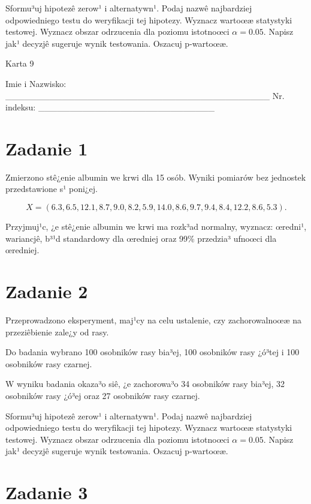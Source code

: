 \documentclass[a4paper,12pt]{article}
\begin{document}
     Sformu³uj hipotezê zerow¹ i alternatywn¹. 
     Podaj nazwê najbardziej odpowiedniego testu do weryfikacji tej hipotezy. 
     Wyznacz wartoœæ statystyki testowej. 
     Wyznacz obszar odrzucenia dla poziomu istotnoœci $\alpha=0.05$. 
     Napisz jak¹ decyzjê sugeruje wynik testowania. 
     Oszacuj p-wartoœæ. \vspace{1cm} 

  \clearpage  Karta  9  

 Imie i Nazwisko: \_\_\_\_\_\_\_\_\_\_\_\_\_\_\_\_\_\_\_\_\_\_\_\_\_\_\_\_\_\_\_\_\_\_\_\_\_\_\_\_\_\_ Nr. indeksu: \_\_\_\_\_\_\_\_\_\_\_\_\_\_\_\_\_\_\_\_\_\_\_\_\_\_\_\_ 
 \section*{Zadanie 1}
     
     Zmierzono stê¿enie albumin we krwi dla 15 osób. 
     Wyniki pomiarów bez jednostek przedstawione s¹ poni¿ej. 
     
     \noindent $$X=(  6.3,  6.5, 12.1,  8.7,  9.0,  8.2,  5.9, 14.0,  8.6,  9.7,  9.4,  8.4, 12.2,  8.6,  5.3 ).$$
     
     Przyjmuj¹c, ¿e stê¿enie albumin we krwi ma rozk³ad normalny, 
     wyznacz: œredni¹, wariancjê, b³¹d standardowy dla œredniej oraz 99\% przedzia³ ufnoœci dla œredniej. \vspace{1cm} 

  \section*{Zadanie 2}
     
  Przeprowadzono eksperyment, maj¹cy na celu ustalenie, czy zachorowalnoœæ na przeziêbienie zale¿y od rasy.
  
  Do badania wybrano 100 osobników rasy bia³ej, 100 osobników rasy ¿ó³tej i 100 osobników rasy czarnej. 
  
  W wyniku badania okaza³o siê, ¿e zachorowa³o 34 osobników rasy bia³ej, 32 osobników rasy ¿ó³ej oraz 27 osobników rasy czarnej. 
  
  Sformu³uj hipotezê zerow¹ i alternatywn¹. 
  Podaj nazwê najbardziej odpowiedniego testu do weryfikacji tej hipotezy. 
  Wyznacz wartoœæ statystyki testowej. 
  Wyznacz obszar odrzucenia dla poziomu istotnoœci $\alpha=0.05$. 
  Napisz jak¹ decyzjê sugeruje wynik testowania. Oszacuj p-wartoœæ. \vspace{1cm} 

  \section*{Zadanie 3}
     
\end{document}
